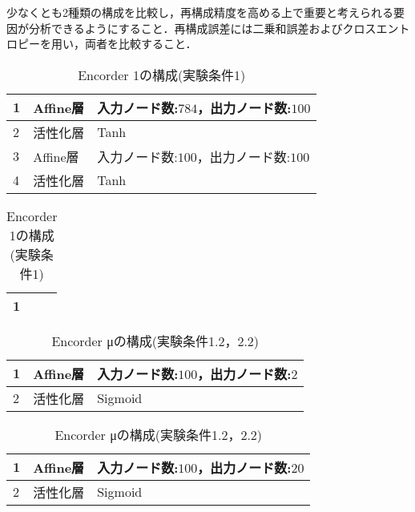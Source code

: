 \documentclass[12pt]{jsarticle}
\begin{document}
少なくとも2種類の構成を比較し，再構成精度を高める上で重要と考えられる要因が分析できるようにすること．再構成誤差には二乗和誤差およびクロスエントロピーを用い，両者を比較すること．
\begin{table}[bt]
\begin{center}
\caption{Encorder 1の構成(実験条件1)}
\label{table:Encorder1-1}
\begin{tabularx}{0.9\linewidth}{|l|l|X|}
\hline
1 & Affine層 & 入力ノード数:$784$，出力ノード数:$100$ \\
\hline
2 & 活性化層 & Tanh \\
\hline
3 & Affine層 & 入力ノード数:$100$，出力ノード数:$100$ \\
\hline
4 & 活性化層 & Tanh
\hline
\end{tabularx}
\end{center}
\end{table}

\begin{table}[bt]
\begin{center}
\caption{Encorder 1の構成(実験条件1)}
\label{table:Encorder1-2}
\begin{tabularx}{0.9\linewidth}{|l|l|X|}
\hline
1 &  &  \\
\hline
\end{tabularx}
\end{center}
\end{table}

\begin{table}[bt]
\begin{center}
\caption{Encorder μの構成(実験条件1.2，2.2)}
\label{table:Encorder mu-1}
\begin{tabularx}{0.9\linewidth}{|l|l|X|}
\hline
1 & Affine層 & 入力ノード数:$100$，出力ノード数:$2$ \\
\hline
2 & 活性化層 & Sigmoid \\
\hline
\end{tabularx}
\end{center}
\end{table}

\begin{table}[bt]
\begin{center}
\caption{Encorder μの構成(実験条件1.2，2.2)}
\label{table:Encorder mu-2}
\begin{tabularx}{0.9\linewidth}{|l|l|X|}
\hline
1 & Affine層 & 入力ノード数:$100$，出力ノード数:$20$ \\
\hline
2 & 活性化層 & Sigmoid \\
\hline
\end{tabularx}
\end{center}
\end{table}
\end{document}
